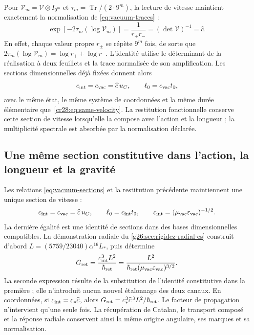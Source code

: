 Pour $\mathcal V_m=\mathcal V\otimes I_{9^m}$ et
$\tau_m=\operatorname{Tr}/(2\cdot9^m)$, la lecture de vitesse
maintient exactement la normalisation de
\eqref{eq:vacuum-traces} :
\begin{equation}
 \exp[-2\tau_m(\log\mathcal V_m)]
   =\frac1{r_+r_-}
   =(\det\mathcal V)^{-1}=\widehat c.
 \label{cr28:eq:velocity-normalized}
\end{equation}
En effet, chaque valeur propre $r_\pm$ se répète $9^m$ fois, de sorte
que $2\tau_m(\log\mathcal V_m)=\log r_++\log r_-$.
L’identité utilise le déterminant de la réalisation à deux feuillets
et la trace normalisée de son amplification. Les sections
dimensionnelles déjà fixées donnent alors
\[
 c_{\rm int}=c_{\rm vac}=\widehat c\,u_C,
 \qquad \ell_0=c_{\rm vac}t_0,
\]
avec le même état, le même système de coordonnées et la même durée élémentaire que~\eqref{cr28:eq:same-velocity}. La restitution fonctionnelle conserve cette section de vitesse lorsqu'elle la compose avec l'action et la longueur ; la multiplicité spectrale est absorbée par la normalisation déclarée.


\subsection{Une même section constitutive dans l'action, la longueur et la gravité}
\label{cr28:sec:constitutive-radial} Les relations \eqref{eq:vacuum-sections} et la restitution précédente maintiennent une unique section de vitesse :
\begin{equation}
 c_{\rm int}=c_{\rm vac}=\widehat c\,u_C,\qquad
 \ell_0=c_{\rm int}t_0,\qquad
 c_{\rm int}=(\mu_{\rm vac}\varepsilon_{\rm vac})^{-1/2}.
 \label{cr28:eq:same-velocity}
\end{equation}
La dernière égalité est une identité de sections dans des bases dimensionnelles compatibles. La démonstration radiale du \cref{g26:sec:rigidez-radial-es} construit d'abord \(L=(5759/23040)\alpha^{16}L_*\), puis détermine
\begin{equation}
 G_{\rm ret}=\frac{c_{\rm int}^3L^2}{\hbar_{\rm ret}}
 =\frac{L^2}
 {\hbar_{\rm ret}(\mu_{\rm vac}\varepsilon_{\rm vac})^{3/2}}.
 \label{cr28:eq:constitutive-gravity}
\end{equation}
La seconde expression résulte de la substitution de l'identité constitutive dans la première ; elle n'introduit aucun nouvel étalonnage des deux canaux. En coordonnées, si \(c_{\rm int}=c_*\widehat c\), alors \(G_{\rm ret}=c_*^3\widehat c^{\,3}L^2/\hbar_{\rm ret}\). Le facteur de propagation n'intervient qu'une seule fois. La récupération de Catalan, le transport composé et la réponse radiale conservent ainsi la même origine angulaire, ses marques et sa normalisation.

